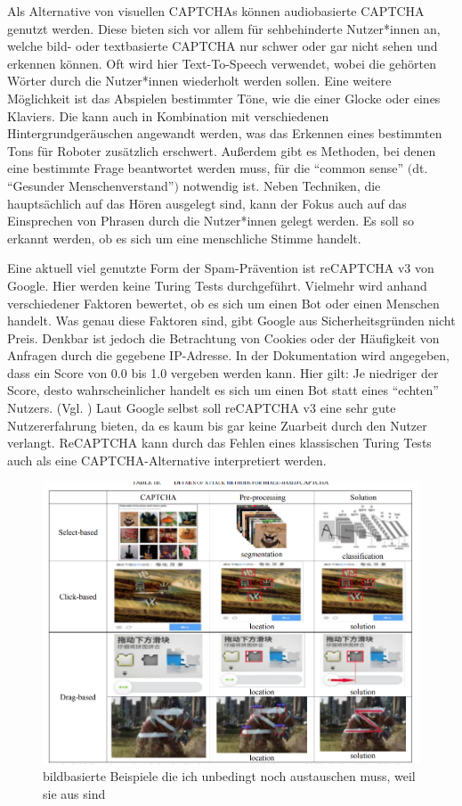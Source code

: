 Als Alternative von visuellen CAPTCHAs können audiobasierte CAPTCHA genutzt werden.
Diese bieten sich vor allem für sehbehinderte Nutzer*innen an, welche bild- oder textbasierte CAPTCHA nur schwer oder gar nicht sehen und erkennen können.
Oft wird hier Text-To-Speech verwendet, wobei die gehörten Wörter durch die Nutzer*innen wiederholt werden sollen.
Eine weitere Möglichkeit ist das Abspielen bestimmter Töne, wie die einer Glocke oder eines Klaviers. 
Die kann auch in Kombination mit verschiedenen Hintergrundgeräuschen angewandt werden, was das Erkennen eines bestimmten Tons für Roboter zusätzlich erschwert.
Außerdem gibt es Methoden, bei denen eine bestimmte Frage beantwortet werden muss, für die ``common sense'' $($dt. ``Gesunder Menschenverstand''$)$ notwendig ist.
Neben Techniken, die hauptsächlich auf das Hören ausgelegt sind, kann der Fokus auch auf das Einsprechen von Phrasen durch die Nutzer*innen gelegt werden.
Es soll so erkannt werden, ob es sich um eine menschliche Stimme handelt.
\cite[p.78]{surveyofresearch}

Eine aktuell viel genutzte Form der Spam-Prävention ist reCAPTCHA v3 von Google. 
Hier werden keine Turing Tests durchgeführt. 
Vielmehr wird anhand verschiedener Faktoren bewertet, ob es sich um einen Bot oder einen Menschen handelt.
Was genau diese Faktoren sind, gibt Google aus Sicherheitsgründen nicht Preis. 
Denkbar ist jedoch die Betrachtung von Cookies oder der Häufigkeit von Anfragen durch die gegebene IP-Adresse.
In der Dokumentation wird angegeben, dass ein Score von 0.0 bis 1.0 vergeben werden kann. 
Hier gilt: Je niedriger der Score, desto wahrscheinlicher handelt es sich um einen Bot statt eines ``echten'' Nutzers. (Vgl. \cite{recaptchadoc})
Laut Google selbst soll reCAPTCHA v3 eine sehr gute Nutzererfahrung bieten, da es kaum bis gar keine Zuarbeit durch den Nutzer verlangt. \cite{googleblog:recaptcha}
ReCAPTCHA kann durch das Fehlen eines klassischen Turing Tests auch als eine CAPTCHA-Alternative interpretiert werden.

\begin{figure}
    \centering
    \includegraphics{gfx/mygraphics/unbedingtaustauschen2.png}
    \caption{bildbasierte Beispiele die ich unbedingt noch austauschen muss, weil sie aus \cite{surveyofresearch} sind}
    \label{fig:pr0grammcaptcha}
\end{figure}

